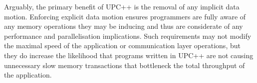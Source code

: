 Arguably, the primary benefit of UPC++ is the removal of any implicit data motion. Enforcing explicit data motion ensures programmers are fully aware of any memory operations they may be inducing and thus are considerate of any performance and parallelisation implications. Such requirements may not modify the maximal speed of the application or communication layer operations, but they do increase the likelihood that programs written in UPC++ are not causing unnecessary slow memory transactions that bottleneck the total throughput of the application. 